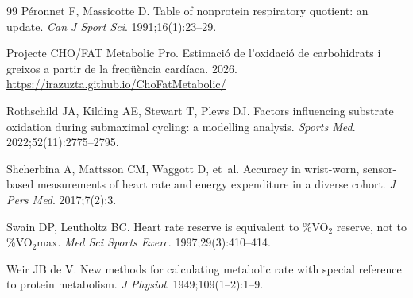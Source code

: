 \documentclass[10pt,a4paper]{article}
\newcommand{\webprojecte}{\url{https://irazuzta.github.io/ChoFatMetabolic/}}
\begin{document}
\begin{thebibliography}{99}
Péronnet F, Massicotte D.
\newblock Table of nonprotein respiratory quotient: an update.
\newblock \emph{Can J Sport Sci}. 1991;16(1):23--29.

Projecte CHO/FAT Metabolic Pro.
\newblock Estimació de l'oxidació de carbohidrats i greixos a partir de la freqüència
  cardíaca. 2026.
\newblock \webprojecte

Rothschild JA, Kilding AE, Stewart T, Plews DJ.
\newblock Factors influencing substrate oxidation during submaximal cycling: a modelling
  analysis.
\newblock \emph{Sports Med}. 2022;52(11):2775--2795.

Shcherbina A, Mattsson CM, Waggott D, et~al.
\newblock Accuracy in wrist-worn, sensor-based measurements of heart rate and energy
  expenditure in a diverse cohort.
\newblock \emph{J Pers Med}. 2017;7(2):3.

Swain DP, Leutholtz BC.
\newblock Heart rate reserve is equivalent to \%VO$_2$ reserve, not to
  \%VO$_2$max.
\newblock \emph{Med Sci Sports Exerc}. 1997;29(3):410--414.

Weir JB de V.
\newblock New methods for calculating metabolic rate with special reference to
  protein metabolism.
\newblock \emph{J Physiol}. 1949;109(1--2):1--9.

\end{thebibliography}
\end{document}
